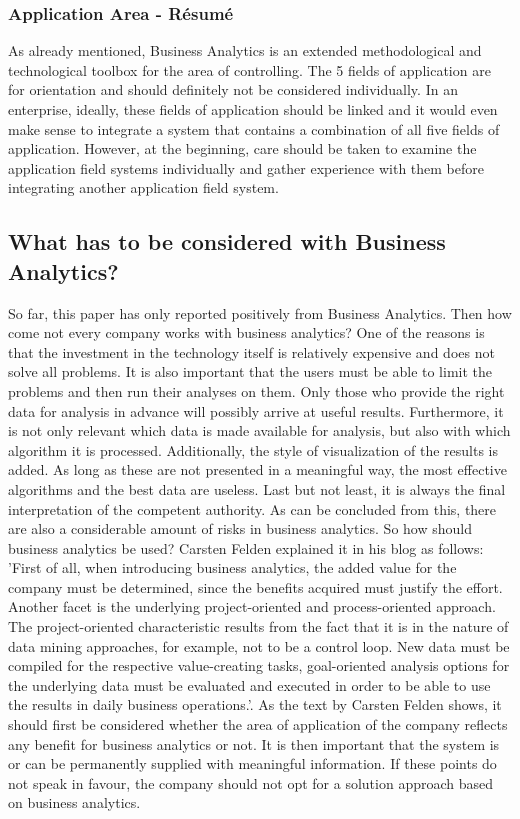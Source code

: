 \documentclass[12pt,twocolumn,twoside]{conference}   %
\begin{document}
\subsubsection{Application Area - Résumé}
As already mentioned, Business Analytics is an extended methodological and technological toolbox for the area of controlling. The 5 fields of application are for orientation and should definitely not be considered individually. In an enterprise, ideally, these fields of application should be linked and it would even make sense to integrate a system that contains a combination of all five fields of application. However, at the beginning, care should be taken to examine the application field systems individually and gather experience with them before integrating another application field system. 

\subsection{What has to be considered with Business Analytics?}
So far, this paper has only reported positively from Business Analytics. Then how come not every company works with business analytics? One of the reasons is that the investment in the technology itself is relatively expensive and does not solve all problems. It is also important that the users must be able to limit the problems and then run their analyses on them. Only those who provide the right data for analysis in advance will possibly arrive at useful results. Furthermore, it is not only relevant which data is made available for analysis, but also with which algorithm it is processed. Additionally, the style of visualization of the results is added. As long as these are not presented in a meaningful way, the most effective algorithms and the best data are useless. Last but not least, it is always the final interpretation of the competent authority. As can be concluded from this, there are also a considerable amount of risks in business analytics. So how should business analytics be used? Carsten Felden explained it in his blog as follows: 'First of all, when introducing business analytics, the added value for the company must be determined, since the benefits acquired must justify the effort. Another facet is the underlying project-oriented and process-oriented approach. The project-oriented characteristic results from the fact that it is in the nature of data mining approaches, for example, not to be a control loop. New data must be compiled for the respective value-creating tasks, goal-oriented analysis options for the underlying data must be evaluated and executed in order to be able to use the results in daily business operations.'. \cite{Wirtschaftsinformatik} As the text by Carsten Felden shows, it should first be considered whether the area of application of the company reflects any benefit for business analytics or not. It is then important that the system is or can be permanently supplied with meaningful information. If these points do not speak in favour, the company should not opt for a solution approach based on business analytics.
\end{document}

